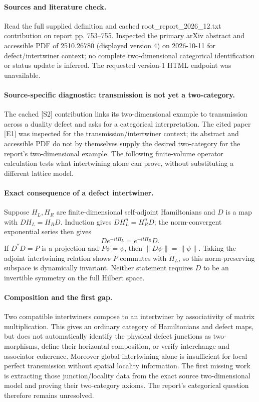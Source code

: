\documentclass[11pt]{article}
\begin{document}
\paragraph{Sources and literature check.}
Read the full supplied definition and cached root\_report\_2026\_12.txt contribution on report pp. 753–755. Inspected the primary arXiv abstract and accessible PDF of 2510.26780 (displayed version 4) on 2026-10-11 for defect/intertwiner context; no complete two-dimensional categorical identification or status update is inferred. The requested version-1 HTML endpoint was unavailable.

\paragraph{Source-specific diagnostic: transmission is not yet a two-category.} The cached [S2] contribution links its two-dimensional example to transmission across a duality defect and asks for a categorical interpretation. The cited paper [E1] was inspected for the transmission/intertwiner context; its abstract and accessible PDF do not by themselves supply the desired two-category for the report's two-dimensional example. The following finite-volume operator calculation tests what intertwining alone can prove, without substituting a different lattice model.
\paragraph{Exact consequence of a defect intertwiner.} Suppose \(H_L,H_R\) are finite-dimensional self-adjoint Hamiltonians and \(D\) is a map with \(DH_L=H_RD\). Induction gives \(DH_L^n=H_R^nD\); the norm-convergent exponential series then gives
\[
 De^{-itH_L}=e^{-itH_R}D.
\]
If \(D^*D=P\) is a projection and \(P\psi=\psi\), then \(\|D\psi\|=\|\psi\|\). Taking the adjoint intertwining relation shows \(P\) commutes with \(H_L\), so this norm-preserving subspace is dynamically invariant. Neither statement requires \(D\) to be an invertible symmetry on the full Hilbert space.
\paragraph{Composition and the first gap.} Two compatible intertwiners compose to an intertwiner by associativity of matrix multiplication. This gives an ordinary category of Hamiltonians and defect maps, but does not automatically identify the physical defect junctions as two-morphisms, define their horizontal composition, or verify interchange and associator coherence. Moreover global intertwining alone is insufficient for local perfect transmission without spatial locality information. The first missing work is extracting those junction/locality data from the exact source two-dimensional model and proving their two-category axioms. The report's categorical question therefore remains unresolved.
\end{document}
